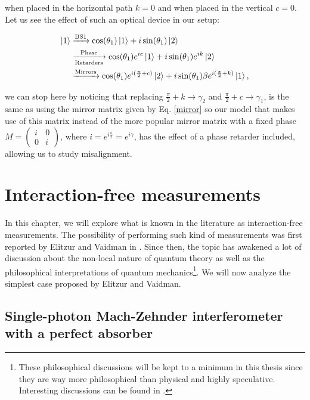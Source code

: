 \documentclass[12pt]{book}
\newcommand\blankpage{
    \null
    \thispagestyle{empty}
    \addtocounter{page}{0}
    \newpage
    }
\begin{document}
when placed in the horizontal path $k=0$ and when placed in the vertical $c=0$. Let us see the effect of such an optical device in our setup:

\begin{align*}
\ket{1}&\xrightarrow{\text{BS1}}\cos(\theta_{1})\ket{1}+i\sin(\theta_{1})\ket{2}\\ &\xrightarrow[\text{Retarders}]{\text{Phase}}\cos(\theta_{1})e^{ic}\ket{1}+i\sin(\theta_{1}) e^{ik}\ket{2} \\ &\xrightarrow{\text{Mirrors}} \cos(\theta_{1})e^{i(\frac{\pi}{2}+c)}\ket{2}+i\sin(\theta_{1})\beta e^{i(\frac{\pi}{2}+k)}\ket{1},
\end{align*}

we can stop here by noticing that replacing $\frac{\pi}{2}+k\xrightarrow{}\gamma_{2}$ and  $\frac{\pi}{2}+c\xrightarrow{}\gamma_{1}$,  is the same as using the mirror matrix given by Eq. \ref{mirror} so our model that makes use of this matrix  instead of the more popular mirror matrix with a fixed phase $M=\begin{pmatrix} i & 0\\0& i\end{pmatrix}$, where $i=e^{i \frac{\pi}{2}}=e^{i\gamma}$, has the  effect of a phase retarder included, allowing us to study misalignment. 

\afterpage{\blankpage}

\chapter{ Interaction-free  measurements}


In this chapter, we will explore what is known in the literature as interaction-free measurements. The possibility of performing such kind of measurements was first reported by Elitzur and Vaidman in \cite{Elitzur}. Since then, the topic has awakened a lot of discussion about the non-local nature of quantum theory as well as the philosophical interpretations of quantum mechanics\footnote{ These philosophical discussions will be kept to a minimum in this thesis since they are way more philosophical than physical and highly speculative. Interesting discussions can be found in \cite{paper_vaidman, maudlin}. }. We will now analyze the simplest case proposed by Elitzur and Vaidman.

\section[Elitzur-Vaidman's bomb detector]{Single-photon Mach-Zehnder interferometer with a perfect absorber}
\end{document}
